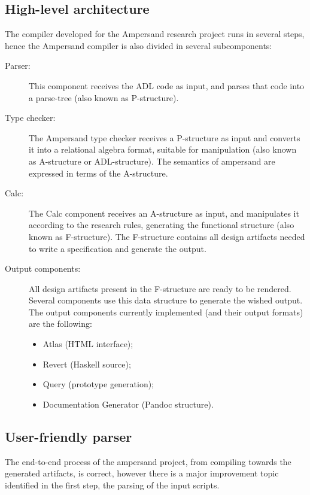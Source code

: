 \subsection{High-level architecture}
\label{subsec:architecture}
The compiler developed for the Ampersand research project runs in several steps, hence the Ampersand compiler is also divided in several subcomponents:
%
%
%
%
\begin{description}
	\item[Parser:] This component receives the ADL code as input, and parses that code into a parse-tree (also known as P-structure).
	\item[Type checker:] The Ampersand type checker receives a P-structure as input and converts it into a relational algebra format, suitable for manipulation (also known as A-structure or ADL-structure).
		 The semantics of ampersand are expressed in terms of the A-structure.
	\item[Calc:] The Calc component receives an A-structure as input, and manipulates it according to the research rules, generating the functional structure (also known as F-structure).
		The F-structure contains all design artifacts needed to write a specification and generate the output.
	\item[Output components:] All design artifacts present in the F-structure are ready to be rendered.
		Several components use this data structure to generate the wished output.
		The output components currently implemented (and their output formats) are the following: 
		\begin{itemize}
			\item Atlas (HTML interface);
			\item Revert (Haskell source);
			\item Query (prototype generation);
			\item Documentation Generator (Pandoc structure).
		\end{itemize}
\end{description}

\subsection{User-friendly parser}
The end-to-end process of the ampersand project, from compiling towards the generated artifacts, is correct, however there is a major improvement topic identified in the first step, the parsing of the input scripts.

